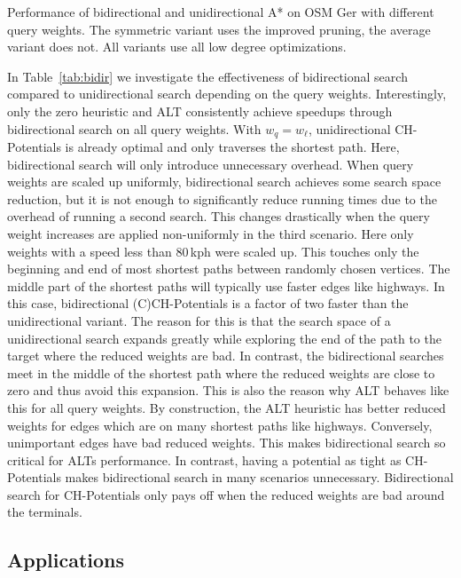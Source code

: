 \documentclass[manuscript,review]{acmart}
\begin{document}
\begin{table}
\centering
\caption{
Performance of bidirectional and unidirectional A* on OSM Ger with different query weights.
The symmetric variant uses the improved pruning, the average variant does not.
All variants use all low degree optimizations.
}\label{tab:bidir}

\end{table}

In Table~\ref{tab:bidir} we investigate the effectiveness of bidirectional search compared to unidirectional search depending on the query weights.
Interestingly, only the zero heuristic and ALT consistently achieve speedups through bidirectional search on all query weights.
With $w_q = w_{\ell}$, unidirectional CH-Potentials is already optimal and only traverses the shortest path.
Here, bidirectional search will only introduce unnecessary overhead.
When query weights are scaled up uniformly, bidirectional search achieves some search space reduction, but it is not enough to significantly reduce running times due to the overhead of running a second search.
This changes drastically when the query weight increases are applied non-uniformly in the third scenario.
Here only weights with a speed less than 80\,kph were scaled up.
This touches only the beginning and end of most shortest paths between randomly chosen vertices.
The middle part of the shortest paths will typically use faster edges like highways.
In this case, bidirectional (C)CH-Potentials is a factor of two faster than the unidirectional variant.
The reason for this is that the search space of a unidirectional search expands greatly while exploring the end of the path to the target where the reduced weights are bad.
In contrast, the bidirectional searches meet in the middle of the shortest path where the reduced weights are close to zero and thus avoid this expansion.
This is also the reason why ALT behaves like this for all query weights.
By construction, the ALT heuristic has better reduced weights for edges which are on many shortest paths like highways.
Conversely, unimportant edges have bad reduced weights.
This makes bidirectional search so critical for ALTs performance.
In contrast, having a potential as tight as CH-Potentials makes bidirectional search in many scenarios unnecessary.
Bidirectional search for CH-Potentials only pays off when the reduced weights are bad around the terminals.

\subsection{Applications}
\end{document}
